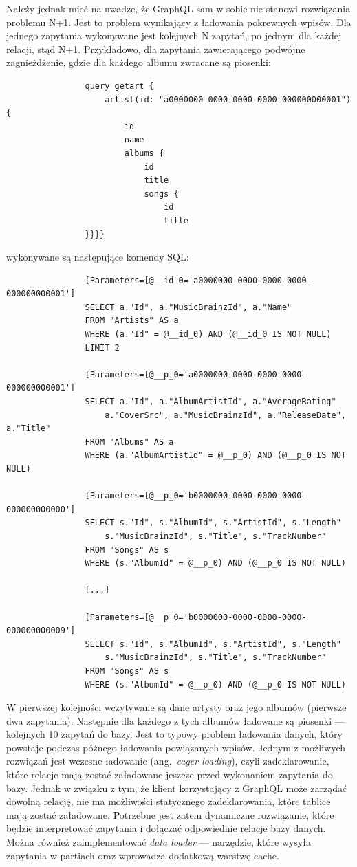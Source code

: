 			Należy jednak mieć na uwadze, że GraphQL sam w sobie nie stanowi rozwiązania problemu N+1.
			Jest to problem wynikający z ładowania pokrewnych wpisów.
			Dla jednego zapytania wykonywane jest kolejnych N zapytań, po jednym dla każdej relacji, stąd N+1.
			Przykładowo, dla zapytania zawierającego podwójne zagnieżdżenie, gdzie dla każdego albumu zwracane są piosenki:
			\begin{lstlisting}
				query getart {
					artist(id: "a0000000-0000-0000-0000-000000000001") {
						id
						name
						albums {
							id
							title
							songs {
								id
								title
				}}}}
			\end{lstlisting}
			wykonywane są następujące komendy SQL:
			\begin{lstlisting}
				[Parameters=[@__id_0='a0000000-0000-0000-0000-000000000001']
				SELECT a."Id", a."MusicBrainzId", a."Name"
				FROM "Artists" AS a
				WHERE (a."Id" = @__id_0) AND (@__id_0 IS NOT NULL)
				LIMIT 2

				[Parameters=[@__p_0='a0000000-0000-0000-0000-000000000001']
				SELECT a."Id", a."AlbumArtistId", a."AverageRating"
					a."CoverSrc", a."MusicBrainzId", a."ReleaseDate", a."Title"
				FROM "Albums" AS a
				WHERE (a."AlbumArtistId" = @__p_0) AND (@__p_0 IS NOT NULL)

				[Parameters=[@__p_0='b0000000-0000-0000-0000-000000000000']
				SELECT s."Id", s."AlbumId", s."ArtistId", s."Length"
					s."MusicBrainzId", s."Title", s."TrackNumber"
				FROM "Songs" AS s
				WHERE (s."AlbumId" = @__p_0) AND (@__p_0 IS NOT NULL)

				[...]

				[Parameters=[@__p_0='b0000000-0000-0000-0000-000000000009']
				SELECT s."Id", s."AlbumId", s."ArtistId", s."Length"
					s."MusicBrainzId", s."Title", s."TrackNumber"
				FROM "Songs" AS s
				WHERE (s."AlbumId" = @__p_0) AND (@__p_0 IS NOT NULL)
			\end{lstlisting}
			W pierwszej kolejności wczytywane są dane artysty oraz jego albumów (pierwsze dwa zapytania).
			Następnie dla każdego z tych albumów ładowane są piosenki --- kolejnych 10 zapytań do bazy.
			Jest to typowy problem ładowania danych, który powstaje podczas późnego ładowania powiązanych wpisów.
			Jednym z możliwych rozwiązań jest wczesne ładowanie (ang.\ \emph{eager loading}), czyli zadeklarowanie, które relacje mają zostać załadowane jeszcze przed wykonaniem zapytania do bazy.
			Jednak w związku z tym, że klient korzystający z GraphQL może zarządać dowolną relację, nie ma możliwości statycznego zadeklarowania, które tablice mają zostać załadowane.
			Potrzebne jest zatem dynamiczne rozwiązanie, które będzie interpretować zapytania i dołączać odpowiednie relacje bazy danych.
			Można również zaimplementować \emph{data loader} --- narzędzie, które wysyła zapytania w partiach oraz wprowadza dodatkową warstwę cache.

